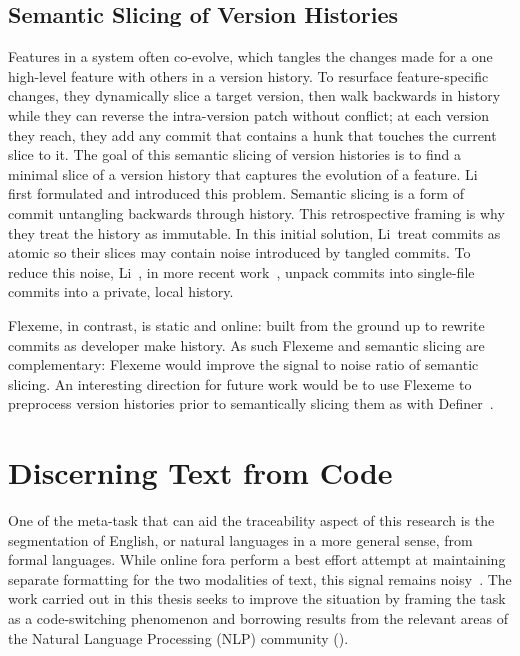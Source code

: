 \subsection{Semantic Slicing of Version Histories}
\label{chapter:literature:sec:flexeme_rel_work:sem_slice_vh}

Features in a system often co-evolve, which tangles the changes made for a one
high-level feature with others in a version history. To resurface
feature-specific changes, they dynamically slice a target version, then walk
backwards in history while they can reverse the intra-version patch without
conflict; at each version they reach, they add any commit that contains a hunk
that touches the current slice to it. The goal of this semantic slicing of
version histories is to find a minimal slice of a version history that captures
the evolution of a feature. Li~\etal~\cite{Li2018, li2015semantic} first
formulated and introduced this problem. Semantic slicing is a form of commit
untangling backwards through history.  This retrospective framing is why they
treat the history as immutable. In this initial solution, Li~\etal treat commits
as atomic so their slices may contain noise introduced by tangled commits. To
reduce this noise, Li~\etal, in more recent work~\cite{Li2019}, unpack commits
into single-file commits into a private, local history.

Flexeme, in contrast, is static and online:  built from the ground up to rewrite
commits as developer make history.  
As such Flexeme and semantic slicing are complementary:  Flexeme would improve
the signal to noise ratio of semantic slicing. An interesting direction for
future work would be to use Flexeme to preprocess version histories prior to
semantically slicing them as with Definer~\cite{Li2019}.

\section{Discerning Text from Code}
\label{chapter:literature:sec:posit_rel_work}

One of the meta-task that can aid the traceability aspect of this research is
the segmentation of English, or natural languages in a more general sense, from
formal languages. While online fora perform a best effort attempt at maintaining
separate formatting for the two modalities of text, this signal remains
noisy~\cite{ponzanelli2014improving}. The work carried out in this thesis seeks
to improve the situation by framing the task as a code-switching phenomenon and
borrowing results from the relevant areas of the Natural Language Processing
(NLP) community ().

